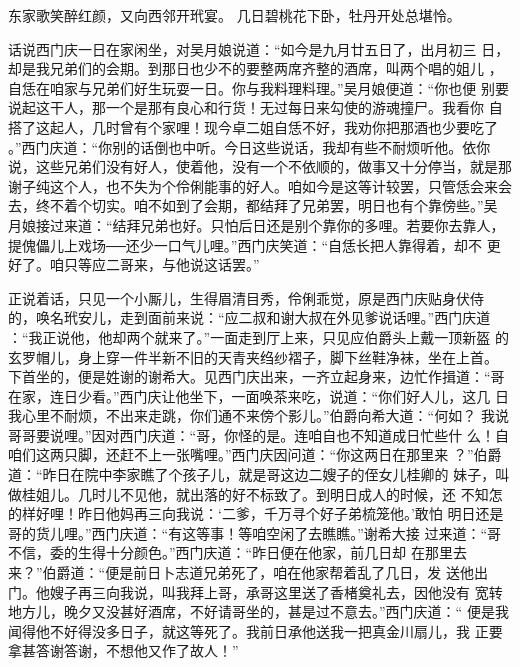 东家歌笑醉红颜，又向西邻开玳宴。
几日碧桃花下卧，牡丹开处总堪怜。

话说西门庆一日在家闲坐，对吴月娘说道：“如今是九月廿五日了，出月初三
日，却是我兄弟们的会期。到那日也少不的要整两席齐整的酒席，叫两个唱的姐儿
，自恁在咱家与兄弟们好生玩耍一日。你与我料理料理。”吴月娘便道：“你也便
别要说起这干人，那一个是那有良心和行货！无过每日来勾使的游魂撞尸。我看你
自搭了这起人，几时曾有个家哩！现今卓二姐自恁不好，我劝你把那酒也少要吃了
。”西门庆道：“你别的话倒也中听。今日这些说话，我却有些不耐烦听他。依你
说，这些兄弟们没有好人，使着他，没有一个不依顺的，做事又十分停当，就是那
谢子纯这个人，也不失为个伶俐能事的好人。咱如今是这等计较罢，只管恁会来会
去，终不着个切实。咱不如到了会期，都结拜了兄弟罢，明日也有个靠傍些。”吴
月娘接过来道：“结拜兄弟也好。只怕后日还是别个靠你的多哩。若要你去靠人，
提傀儡儿上戏场──还少一口气儿哩。”西门庆笑道：“自恁长把人靠得着，却不
更好了。咱只等应二哥来，与他说这话罢。”

正说着话，只见一个小厮儿，生得眉清目秀，伶俐乖觉，原是西门庆贴身伏侍
的，唤名玳安儿，走到面前来说：“应二叔和谢大叔在外见爹说话哩。”西门庆道
：“我正说他，他却两个就来了。”一面走到厅上来，只见应伯爵头上戴一顶新盔
的玄罗帽儿，身上穿一件半新不旧的天青夹绉纱褶子，脚下丝鞋净袜，坐在上首。
下首坐的，便是姓谢的谢希大。见西门庆出来，一齐立起身来，边忙作揖道：“哥
在家，连日少看。”西门庆让他坐下，一面唤茶来吃，说道：“你们好人儿，这几
日我心里不耐烦，不出来走跳，你们通不来傍个影儿。”伯爵向希大道：“何如？
我说哥哥要说哩。”因对西门庆道：“哥，你怪的是。连咱自也不知道成日忙些什
么！自咱们这两只脚，还赶不上一张嘴哩。”西门庆因问道：“你这两日在那里来
？”伯爵道：“昨日在院中李家瞧了个孩子儿，就是哥这边二嫂子的侄女儿桂卿的
妹子，叫做桂姐儿。几时儿不见他，就出落的好不标致了。到明日成人的时候，还
不知怎的样好哩！昨日他妈再三向我说：‘二爹，千万寻个好子弟梳笼他。’敢怕
明日还是哥的货儿哩。”西门庆道：“有这等事！等咱空闲了去瞧瞧。”谢希大接
过来道：“哥不信，委的生得十分颜色。”西门庆道：“昨日便在他家，前几日却
在那里去来？”伯爵道：“便是前日卜志道兄弟死了，咱在他家帮着乱了几日，发
送他出门。他嫂子再三向我说，叫我拜上哥，承哥这里送了香楮奠礼去，因他没有
宽转地方儿，晚夕又没甚好酒席，不好请哥坐的，甚是过不意去。”西门庆道：“
便是我闻得他不好得没多日子，就这等死了。我前日承他送我一把真金川扇儿，我
正要拿甚答谢答谢，不想他又作了故人！”

